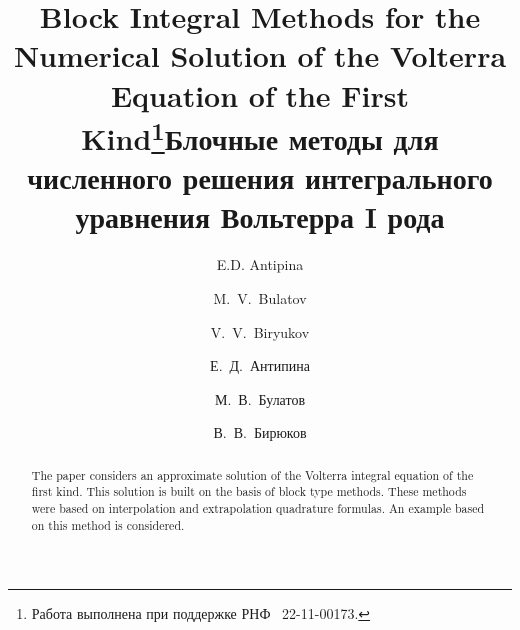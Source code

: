 \documentclass[12pt]{llncs}  %
\begin{document}
%
\fi

\begin{englishtitle} %
\title{Block Integral Methods for the Numerical Solution of the Volterra Equation of the First Kind\thanks{Работа выполнена при поддержке РНФ \textnumero~22-11-00173.}}
\author{E.D. Antipina 
  \and
  M.~V.~Bulatov
  \and
  V.~V.~Biryukov
}


\maketitle

\begin{abstract}
The paper considers an approximate solution of the Volterra integral equation of the first kind. This solution is built on the basis of block type methods. These methods were based on interpolation and extrapolation quadrature formulas. An example based on this method is considered.

\end{abstract}
\end{englishtitle}

\title{Блочные методы для численного решения интегрального уравнения Вольтерра I рода}
\author{Е.~Д.~Антипина  %
  \and  %
  М.~В.~Булатов
  \and
  В.~В.~Бирюков
} %

\end{document}
